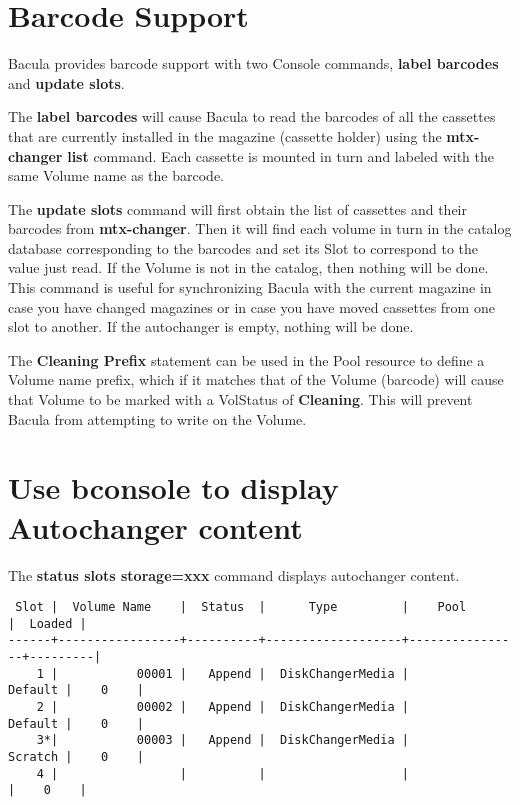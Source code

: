 \label{Barcodes}

\section{Barcode Support}

Bacula provides barcode support with two Console commands, {\bf label
barcodes} and {\bf update slots}.

The {\bf label barcodes} will cause Bacula to read the barcodes of all the
cassettes that are currently installed in the magazine (cassette holder) using
the {\bf mtx-changer} {\bf list} command. Each cassette is mounted in turn and
labeled with the same Volume name as the barcode. 

The {\bf update slots} command will first obtain the list of cassettes and
their barcodes from {\bf mtx-changer}. Then it will find each volume in turn
in the catalog database corresponding to the barcodes and set its Slot to
correspond to the value just read. If the Volume is not in the catalog, then
nothing will be done. This command is useful for synchronizing Bacula with the
current magazine in case you have changed magazines or in case you have moved
cassettes from one slot to another. If the autochanger is empty, nothing will
be done.

The {\bf Cleaning Prefix} statement can be used in the Pool resource to define
a Volume name prefix, which if it matches that of the Volume (barcode) will
cause that Volume to be marked with a VolStatus of {\bf Cleaning}. This will
prevent Bacula from attempting to write on the Volume.

\section{Use bconsole to display Autochanger content}

The {\bf status slots storage=xxx} command displays autochanger content.

\footnotesize
\begin{verbatim}
 Slot |  Volume Name    |  Status  |      Type         |    Pool        |  Loaded |
------+-----------------+----------+-------------------+----------------+---------|
    1 |           00001 |   Append |  DiskChangerMedia |        Default |    0    |
    2 |           00002 |   Append |  DiskChangerMedia |        Default |    0    |
    3*|           00003 |   Append |  DiskChangerMedia |        Scratch |    0    |
    4 |                 |          |                   |                |    0    |
\end{verbatim}
\normalsize

